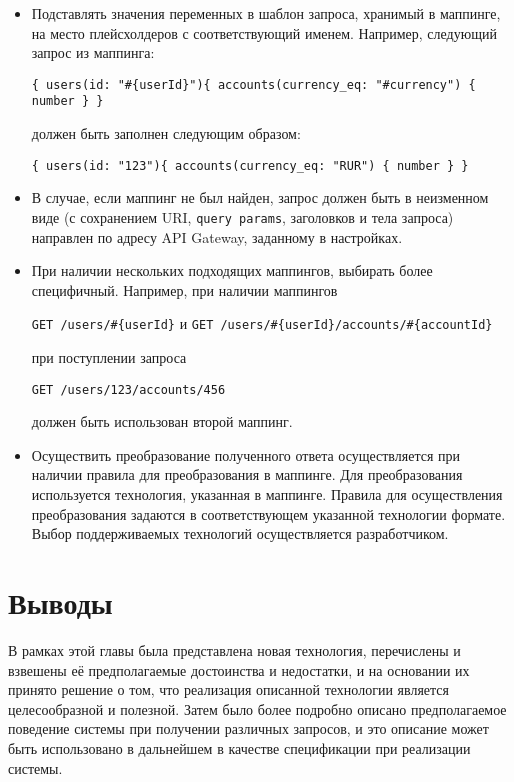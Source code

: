 \begin{itemize}
    \item Подставлять значения переменных в шаблон запроса, хранимый в маппинге, на место плейсхолдеров с соответствующий именем.
    Например, следующий запрос из маппинга:

    \texttt{\{ users(id: "\#\{userId\}")\{ accounts(currency\_eq: "\#{currency}") \{ number \} \}}

    должен быть заполнен следующим образом:

    \texttt{\{ users(id: "123")\{ accounts(currency\_eq: "RUR") \{ number \} \}}

    \item В случае, если маппинг не был найден, запрос должен быть в неизменном виде (с сохранением URI, \texttt{query params}, заголовков и тела запроса) направлен по адресу API Gateway, заданному в настройках.

    \item При наличии нескольких подходящих маппингов, выбирать более специфичный.
    Например, при наличии маппингов

    \texttt{GET /users/\#\{userId\}} и \texttt{GET /users/\#\{userId\}/accounts/\#\{accountId\}}

    при поступлении запроса

    \texttt{GET /users/123/accounts/456}

    должен быть использован второй маппинг.

    \item Осуществить преобразование полученного ответа осуществляется при наличии правила для преобразования в маппинге.
    Для преобразования используется технология, указанная в маппинге.
    Правила для осуществления преобразования задаются в соответствующем указанной технологии формате.
    Выбор поддерживаемых технологий осуществляется разработчиком.
\end{itemize}


\section{Выводы} \label{sec:ch2-conclusion}

В рамках этой главы была представлена новая технология, перечислены и взвешены её предполагаемые достоинства и недостатки, и на основании их принято решение о том, что реализация описанной технологии является целесообразной и полезной.
Затем было более подробно описано предполагаемое поведение системы при получении различных запросов, и это описание может быть использовано в дальнейшем в качестве спецификации при реализации системы.
